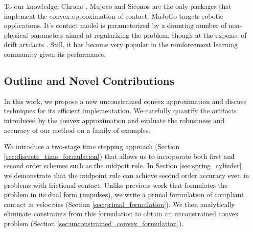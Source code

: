To our knowledge, Chrono \cite{bib:chrono2016}, Mujoco \cite{bib:mujoco} and
Siconos \cite{bib:acary2019siconos} are the only packages that implement the
convex approximation of contact.  MuJoCo targets robotic applications.
It's contact model is parameterized by a daunting number of non-physical
parameters aimed at regularizing the problem, though at the expense of drift
artifacts \cite{bib:simbenchmark}. Still, it has become very popular in the
reinforcement learning community given its performance.

\subsection{Outline and Novel Contributions}
 In this work, we propose a new
unconstrained convex approximation and discuss techniques for its efficient
implementation. We carefully quantify the artifacts introduced by the convex
approximation and evaluate the robustness and accuracy of our method on a family
of examples.

We introduce a two-stage time stepping approach (Section
\ref{sec:discrete_time_formulation}) that allows us to incorporate both first
and second order schemes such as the midpoit rule. In Section \ref{sec:spring_cylinder} we
demonstrate that the midpoint rule can achieve second order accuracy even in
problems with frictional contact. Unlike previous work
\cite{bib:anitescu2010,bib:todorov2014} that formulates the problem in its dual
form (impulses), we write a primal formulation of compliant contact in
velocities (Section \ref{sec:primal_formulation}). We then analytically
eliminate constraints from this formulation to obtain an unconstrained convex
problem (Section \ref{sec:unconstrained_convex_formulation}).

